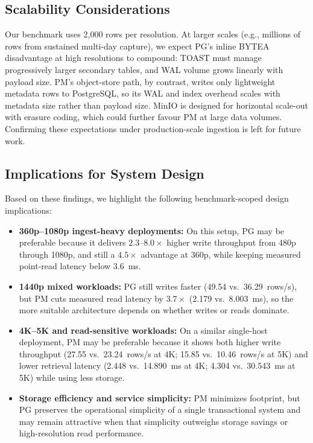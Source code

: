 \documentclass[conference, a4paper]{IEEEtran}
\begin{document}
\subsection{Scalability Considerations}
Our benchmark uses 2,000 rows per resolution. At larger scales (e.g., millions of rows from sustained multi-day capture), we expect PG's inline BYTEA disadvantage at high resolutions to compound: TOAST must manage progressively larger secondary tables, and WAL volume grows linearly with payload size. PM's object-store path, by contrast, writes only lightweight metadata rows to PostgreSQL, so its WAL and index overhead scales with metadata size rather than payload size. MinIO is designed for horizontal scale-out with erasure coding, which could further favour PM at large data volumes. Confirming these expectations under production-scale ingestion is left for future work.

\subsection{Implications for System Design}
Based on these findings, we highlight the following benchmark-scoped design implications:
\begin{itemize}
    \item \textbf{360p--1080p ingest-heavy deployments:} On this setup, PG may be preferable because it delivers $2.3$--$8.0\times$ higher write throughput from 480p through 1080p, and still a $4.5\times$ advantage at 360p, while keeping measured point-read latency below 3.6~ms.
    \item \textbf{1440p mixed workloads:} PG still writes faster (49.54 vs.\ 36.29~rows/s), but PM cuts measured read latency by $3.7\times$ (2.179 vs.\ 8.003~ms), so the more suitable architecture depends on whether writes or reads dominate.
    \item \textbf{4K--5K and read-sensitive workloads:} On a similar single-host deployment, PM may be preferable because it shows both higher write throughput (27.55 vs.\ 23.24~rows/s at 4K; 15.85 vs.\ 10.46~rows/s at 5K) and lower retrieval latency (2.448 vs.\ 14.890~ms at 4K; 4.304 vs.\ 30.543~ms at 5K) while using less storage.
    \item \textbf{Storage efficiency and service simplicity:} PM minimizes footprint, but PG preserves the operational simplicity of a single transactional system and may remain attractive when that simplicity outweighs storage savings or high-resolution read performance.
\end{itemize}
\end{document}
